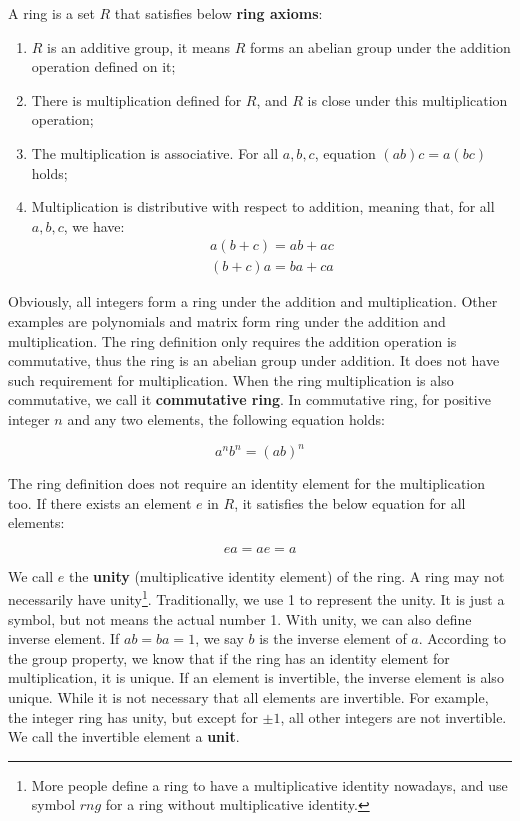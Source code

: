 \documentclass[b5paper]{article}
\begin{document}
\begin{definition}
A ring is a set $R$ that satisfies below \textbf{ring axioms}:
\begin{enumerate}
\item $R$ is an additive group, it means $R$ forms an abelian group under the addition operation defined on it;
\item There is multiplication defined for $R$, and $R$ is close under this multiplication operation;
\item The multiplication is associative. For all $a, b, c$, equation $(ab)c = a(bc)$ holds;
\item Multiplication is distributive with respect to addition, meaning that, for all $a, b, c$, we have:
\[
\begin{array}{l}
a(b + c) = ab + ac \\
(b + c)a = ba + ca
\end{array}
\]
\end{enumerate}
\end{definition}

Obviously, all integers form a ring under the addition and multiplication. Other examples are polynomials and matrix form ring under the addition and multiplication. The ring definition only requires the addition operation is commutative, thus the ring is an abelian group under addition. It does not have such requirement for multiplication. When the ring multiplication is also commutative, we call it \textbf{commutative ring}. In commutative ring, for positive integer $n$ and any two elements, the following equation holds:

\[
a^nb^n = (ab)^n
\]

The ring definition does not require an identity element for the multiplication too. If there exists an element $e$ in $R$, it satisfies the below equation for all elements:

\[
ea = ae = a
\]

We call $e$ the \textbf{unity} (multiplicative identity element) of the ring. A ring may not necessarily have unity\footnote{More people define a ring to have a multiplicative identity nowadays, and use symbol $rng$ for a ring without multiplicative identity.}. Traditionally, we use 1 to represent the unity. It is just a symbol, but not means the actual number 1. With unity, we can also define inverse element. If $ab = ba = 1$, we say $b$ is the inverse element of $a$. According to the group property, we know that if the ring has an identity element for multiplication, it is unique. If an element is invertible, the inverse element is also unique. While it is not necessary that all elements are invertible. For example, the integer ring has unity, but except for $\pm 1$, all other integers are not invertible. We call the invertible element a \textbf{unit}.
\end{document}
